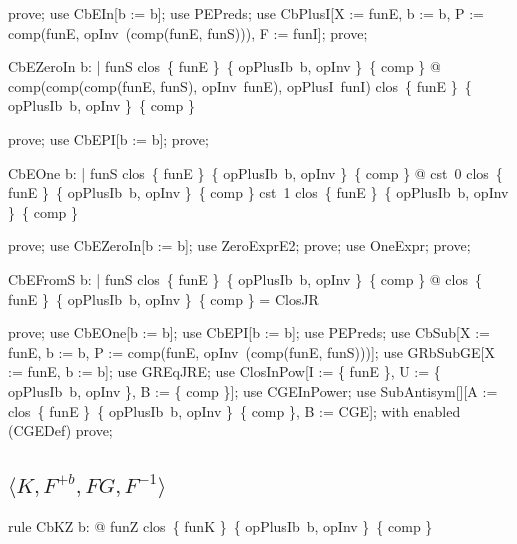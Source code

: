 \documentclass{article}
\begin{document}
\begin{zproof}
prove;
use CbEIn[b := b];
use PEPreds;
use CbPlusI[X := funE, b := b, P := comp(funE, opInv~(comp(funE, funS))), F := funI];
prove;
\end{zproof}

\begin{theorem}{CbEZeroIn}
  \forall b: \nat | funS \in clos~\{ funE \}~\{ opPlusIb~b, opInv \}~\{ comp \} @ comp(comp(comp(funE, funS), opInv~funE), opPlusI~funI) \in clos~\{ funE \}~\{ opPlusIb~b, opInv \}~\{ comp \}
\end{theorem}

\begin{zproof}
prove;
use CbEPI[b := b];
prove;
\end{zproof}

\begin{theorem}{CbEOne}
  \forall b: \nat | funS \in clos~\{ funE \}~\{ opPlusIb~b, opInv \}~\{ comp \} @ cst~0 \in clos~\{ funE \}~\{ opPlusIb~b, opInv \}~\{ comp \} \land cst~1 \in clos~\{ funE \}~\{ opPlusIb~b, opInv \}~\{ comp \}
\end{theorem}

\begin{zproof}
prove;
use CbEZeroIn[b := b];
use ZeroExprE2;
prove;
use OneExpr;
prove;
\end{zproof}

\begin{theorem}{CbEFromS}
  \forall b: \nat | funS \in clos~\{ funE \}~\{ opPlusIb~b, opInv \}~\{ comp \} @ clos~\{ funE \}~\{ opPlusIb~b, opInv \}~\{ comp \} = ClosJR
\end{theorem}

\begin{zproof}
prove;
use CbEOne[b := b];
use CbEPI[b := b];
use PEPreds;
use CbSub[X := funE, b := b, P := comp(funE, opInv~(comp(funE, funS)))];
use GRbSubGE[X := funE, b := b];
use GREqJRE;
use ClosInPow[I := \{ funE \}, U := \{ opPlusIb~b, opInv \}, B := \{ comp \}];
use CGEInPower;
use SubAntisym[\nat \fun \nat][A := clos~\{ funE \}~\{ opPlusIb~b, opInv \}~\{ comp \}, B := CGE];
with enabled (CGEDef) prove;
\end{zproof}


\subsection{$\langle K, F^{+b}, FG, F^{-1}\rangle$}

\begin{theorem}{rule CbKZ}
  \forall b: \nat @ funZ \in clos~\{ funK \}~\{ opPlusIb~b, opInv \}~\{ comp \}
\end{theorem}
\end{document}
